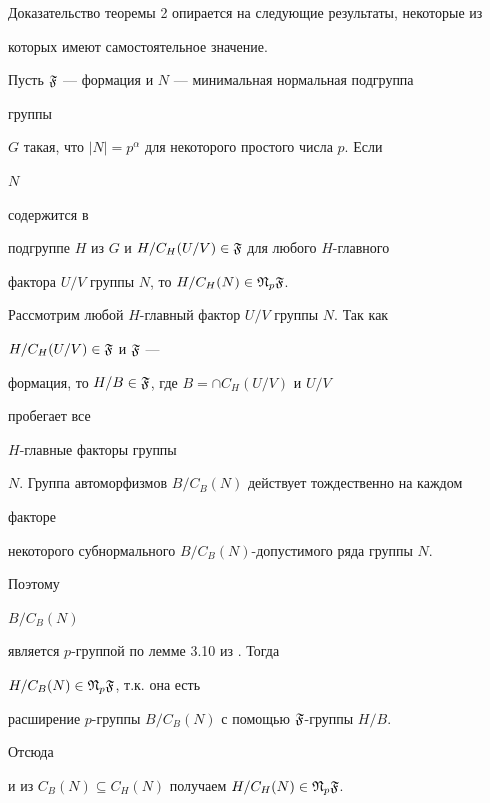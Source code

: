 




Доказательство теоремы 2 опирается на следующие результаты, некоторые из


которых имеют самостоятельное значение.





\begin{lem}


Пусть $\frak F$ --- формация и $N$ --- минимальная нормальная подгруппа


группы


$G$ такая, что $|N|=p^\alpha$ для некоторого простого числа $p$. Если


$N$


содержится в


подгруппе $H$ из $G$ и $H/C_H(U/V)\in\frak F$ для любого $H$-главного


фактора $U/V$ группы $N$, то $H/C_H(N)\in\frak N_p\frak F$.


\end{lem}





\begin{pf}


Рассмотрим любой $H$-главный фактор $U/V$ группы $N$. Так как \linebreak


$H/C_H(U/V)\in\frak F$ и $\frak F$ ---


формация, то $H/B\in\frak F$, где $B=\cap C_H(U/V)$ и $U/V$


пробегает все


$H$-главные факторы группы


$N$. Группа автоморфизмов $B/C_B(N)$ действует тождественно на каждом


факторе


некоторого субнормального $B/C_B(N)$-допустимого ряда группы $N$.


Поэтому


$B/C_B(N)$


является $p$-группой по лемме 3.10 из \cite{She}. Тогда


$H/C_B(N)\in\frak N_p\frak F$, т.к. она есть


расширение $p$-группы $B/C_B(N)$ с помощью $\frak F$-группы $H/B$.


Отсюда


и из $C_B(N)\subseteq C_H(N)$ получаем $H/C_H(N)\in\frak N_p\frak F$.


\end{pf}





